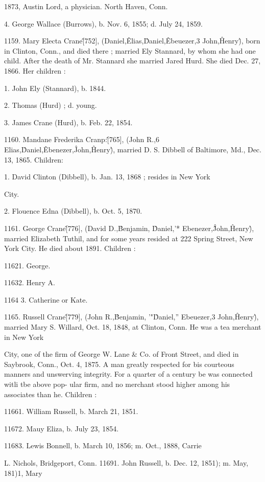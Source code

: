 1873, Austin Lord, a physician. North Haven, Conn. 

4. George Wallace (Burrows), b. Nov. 6, 1855; d. July 24, 1859. 

1159. Mary Electa Crane\^ [752], (Daniel,\^ Elias,\^ Daniel,\^ 
Ebeuezer,3 John,\^ Henry\^), born in Clinton, Conn., and died 
there ; married Ely Stannard, by whom she had one child. After 
the death of Mr. Stannard she married Jared Hurd. She died 
Dec. 27, 1866. Her children : 

1. John Ely (Stannard), b. 1844. 

2. Thomas (Hurd) ; d. young. 

3. James Crane (Hurd), b. Feb. 22, 1854. 

1160. Mandane Frederika Cranp:\^ [765], (John R.,6 Elias,\^ 
Daniel,\^ Ebenezer,\^ John,\^ Henry\^), married D. S. Dibbell of 
Baltimore, Md., Dec. 13, 1865. Children: 

1. David Clinton (Dibbell), b. Jan. 13, 1868 ; resides in New York 

City. 

2. Flouence Edna (Dibbell), b. Oct. 5, 1870. 

1161. George Crane\^ [776], (David D.,\^ Benjamin, \^ Daniel,'* 
Ebenezer,\^\^ John,\^ Henry\^), married Elizabeth Tuthil, and for 
some years resided at 222 Spring Street, New York City. He 
died about 1891. Children : 

11621. George. 

11632. Henry A. 

1164  3. Catherine or Kate. 

1165. Russell Crane\^ [779], (John R.,\^ Benjamin, '"\^ Daniel,'' 
Ebeuezer,3 John,\^ Henry\^), married Mary S. Willard, Oct. 18, 
1848, at Clinton, Conn. He was a tea merchant in New York 




City, one of the firm of George W. Lane \& Co. of Front Street, 
and died in Saybrook, Conn., Oct. 4, 1875. A man greatly 
respected for bis courteous manners and unswerving integrity. 
For a quarter of a century be was connected witli tbe above pop- 
ular firm, and no merchant stood higher among his associates 
than he. Children : 

11661. William Russell, b. March 21, 1851. 

11672. Mauy Eliza, b. July 23, 1854. 

11683. Lewis Bonnell, b. March 10, 1856; m. Oct., 1888, Carrie 

L. Nichols, Bridgeport, Conn. 
11691. John Russell, b. Dec. 12, 1851); m. May, 181)1, Mary 

